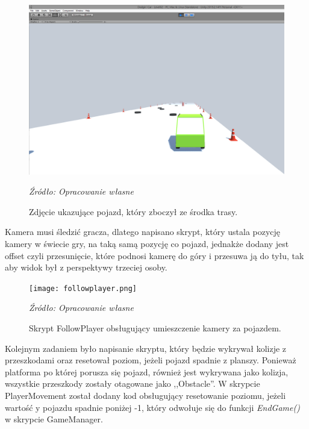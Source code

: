 \begin{figure}[!h]
\centering
  \includegraphics[width=1\linewidth]{playermovelook.png}
  \caption{Zdjęcie ukazujące pojazd, który zboczył ze środka trasy.}\label{rys_5}
  \begin{minipage}[t]{0.75\linewidth}
    \emph{Źródło: Opracowanie własne}
  \end{minipage}
\end{figure}

\newpage
\indent Kamera musi śledzić gracza, dlatego napisano skrypt, który ustala pozycję kamery w świecie gry, na taką samą pozycję co pojazd, jednakże dodany jest offset czyli przesunięcie, które podnosi kamerę do góry i przesuwa ją do tyłu, tak aby widok był z perspektywy trzeciej osoby.

\begin{figure}[!h]
\centering
  \texttt{[image: followplayer.png]}
  \caption{Skrypt FollowPlayer obsługujący umieszczenie kamery za pojazdem.}\label{rys_6}
  \begin{minipage}[t]{0.75\linewidth}
    \emph{Źródło: Opracowanie własne}
  \end{minipage}
\end{figure}

\newpage
\indent Kolejnym zadaniem było napisanie skryptu, który będzie wykrywał kolizje z przeszkodami oraz resetował poziom, jeżeli pojazd spadnie z planszy. Ponieważ platforma po której porusza się pojazd, również jest wykrywana jako kolizja, wszystkie przeszkody zostały otagowane jako ,,Obstacle''. W skrypcie PlayerMovement został dodany kod obsługujący resetowanie poziomu, jeżeli wartość y pojazdu spadnie poniżej -1, który odwołuje się do funkcji \textit{EndGame()} w skrypcie GameManager.

